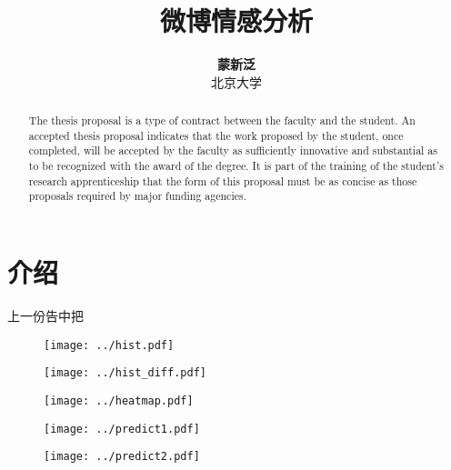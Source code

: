 \documentclass[12pt]{article}
\title{{\bf 微博情感分析}}
\author{ {\bf 蒙新泛}  \\
北京大学\\
}
\begin{document}
\pagestyle{plain}
\maketitle

\begin{abstract}

The thesis proposal is a type of contract between the faculty and the student. 
An accepted thesis proposal indicates that the work proposed by the student, 
once completed, will be accepted by the faculty as sufficiently innovative and 
substantial as to be recognized with the award of the degree. It is part of 
the training of the student's research apprenticeship that the form of this 
proposal must be as concise as those proposals required by major funding 
agencies.

\end{abstract}



\section{介绍}
上一份告中把

\begin{figure}
  \centering
  \texttt{[image: ../hist.pdf]}
\end{figure}

\begin{figure}
  \centering
  \texttt{[image: ../hist\_diff.pdf]}
\end{figure}

\begin{figure}
  \centering
  \texttt{[image: ../heatmap.pdf]}
\end{figure}

\begin{figure}
  \centering
  \texttt{[image: ../predict1.pdf]}
\end{figure}

\begin{figure}
  \centering
  \texttt{[image: ../predict2.pdf]}
\end{figure}
%
%
\end{document}
